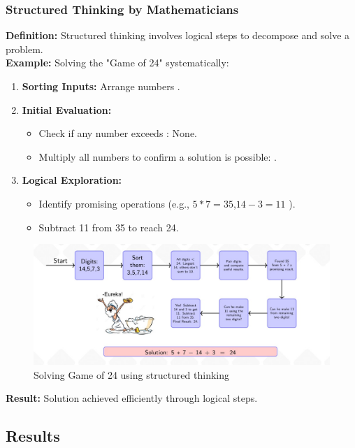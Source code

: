 \documentclass[12pt, a4paper]{article}
\begin{document}
\subsubsection{Structured Thinking by Mathematicians}
\textbf{Definition:} Structured thinking involves logical steps to decompose and solve a problem.\\
\textbf{Example:} Solving the "Game of 24" systematically:
\begin{enumerate}
    \item \textbf{Sorting Inputs:} Arrange numbers .
    \item \textbf{Initial Evaluation:}
    \begin{itemize}
        \item Check if any number exceeds : None.
        \item Multiply all numbers to confirm a solution is possible: .
    \end{itemize}
    \item \textbf{Logical Exploration:}
    \begin{itemize}
        \item Identify promising operations (e.g., $5*7=35$,$14-3=11$ ).
        \item Subtract 11 from 35  to reach 24.
    \end{itemize}
\end{enumerate}
\begin{figure}[H]
    \centering
    \includegraphics[width=\textwidth,height=0.5\textwidth]{WhatsApp Image 2024-12-30 at 22.12.38_3ff0e297.jpg}
    \caption{Solving Game of 24 using structured thinking}
    \label{fig:Solving game iof 24.}
\end{figure}
\textbf{Result:} Solution achieved efficiently through logical steps.

\subsection{Results}
\end{document}
